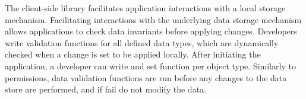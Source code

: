 The \name{} client-side library facilitates application interactions with a local storage mechanism. Facilitating interactions with the underlying data storage mechanism allows \name{} applications to check data invariants before applying changes. Developers write validation functions for all defined data types, which are dynamically checked when a change is set to be applied locally. After initiating the application, a developer can write and set function per object type. Similarly to permissions, data validation functions are run before any changes to the data store are performed, and if fail do not modify the data.


